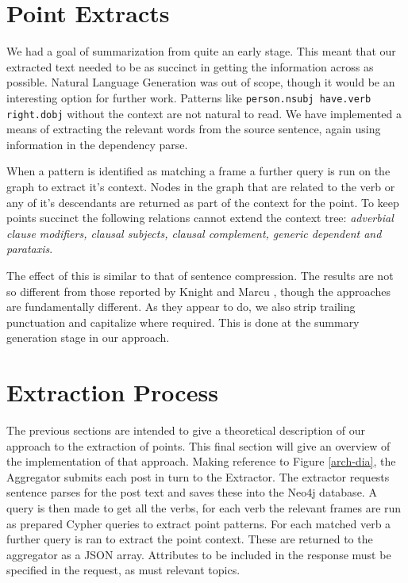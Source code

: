   \section{Point Extracts}
    We had a goal of summarization from quite an early stage. This meant that our extracted text needed to be as succinct in getting the information across as possible. Natural Language Generation was out of scope, though it would be an interesting option for further work. Patterns like \texttt{person.nsubj have.verb right.dobj} without the context are not natural to read. We have implemented a means of extracting the relevant words from the source sentence, again using information in the dependency parse.

    When a pattern is identified as matching a frame a further query is run on the graph to extract it's context. Nodes in the graph that are related to the verb or any of it's descendants are returned as part of the context for the point. To keep points succinct the following relations cannot extend the context tree: \textit{adverbial clause modifiers, clausal subjects, clausal complement, generic dependent and parataxis}.

    The effect of this is similar to that of sentence compression. The results are not so different from those reported by Knight and Marcu \cite{knight2000statistics}, though the approaches are fundamentally different. As they appear to do, we also strip trailing punctuation and capitalize where required. This is done at the summary generation stage in our approach.

  \section{Extraction Process}
    The previous sections are intended to give a theoretical description of our approach to the extraction of points. This final section will give an overview of the implementation of that approach.
    Making reference to Figure \ref{arch-dia}, the Aggregator submits each post in turn to the Extractor. The extractor requests sentence parses for the post text and saves these into the Neo4j database. A query is then made to get all the verbs, for each verb the relevant frames are run as prepared Cypher queries to extract point patterns. For each matched verb a further query is ran to extract the point context. These are returned to the aggregator as a JSON array. Attributes to be included in the response must be specified in the request, as must relevant topics.
